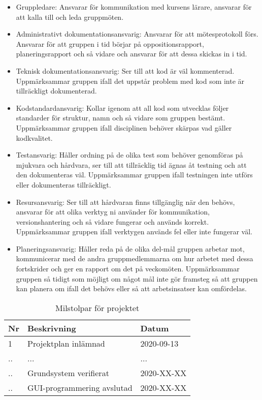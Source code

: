 \documentclass[a4paper]{article}
\begin{document}
\begin{itemize}
    \item Gruppledare: Ansvarar för kommunikation med kursens lärare, ansvarar
    för att kalla till och leda gruppmöten.

\item Administrativt dokumentationsansvarig: Ansvarar för att
    mötesprotokoll förs. Ansvarar för att gruppen i tid börjar på
    oppositionsrapport, planeringsrapport och så vidare och ansvarar för
    att dessa skickas in i tid.

\item Teknisk dokumentationsansvarig: Ser till att kod är väl kommenterad.
    Uppmärksammar gruppen ifall det uppstår problem med kod som inte är
    tillräckligt dokumenterad.

\item Kodstandardansvarig: Kollar igenom att all kod som utvecklas följer
    standarder för struktur, namn och så vidare som gruppen bestämt.
    Uppmärksammar gruppen ifall disciplinen behöver skärpas vad
    gäller kodkvalitet.

\item Testansvarig: Håller ordning på de olika test som behöver genomföras
    på mjukvara och hårdvara, ser till att tillräcklig tid ägnas åt
    testning och att den dokumenteras väl. Uppmärksammar gruppen ifall
    testningen inte utförs eller dokumenteras tillräckligt.

\item Resursansvarig: Ser till att hårdvaran finns tillgänglig när den
    behövs, ansvarar för att olika verktyg ni använder för
    kommunikation, versionshantering och så vidare fungerar och
    används korrekt. Uppmärksammar gruppen ifall verktygen används fel
    eller inte fungerar väl.

\item Planeringsansvarig: Håller reda på de olika del-mål gruppen arbetar
    mot, kommunicerar med de andra gruppmedlemmarna om hur arbetet med
    dessa fortskrider och ger en rapport om det på veckomöten.
    Uppmärksammar gruppen så tidigt som möjligt om något mål inte gör
    framsteg så att gruppen kan planera om ifall det behövs eller så att
    arbetsinsatser kan omfördelas.
    
\end{itemize}

\begin{table}[]
\centering
\begin{tabular}{|l|l|l|}
\hline
    Nr & Beskrivning & Datum \\
    \hline
    1 & Projektplan inlämnad & 2020-09-13 \\
    \hline
    .. & ... & ... \\
    \hline
    .. & Grundsystem verifierat & 2020-XX-XX \\
    \hline
    .. & GUI-programmering avslutad & 2020-XX-XX \\
    \hline
     
\end{tabular}
\caption{Milstolpar för projektet}
\label{milstolpar}
\end{table}
\end{document}
